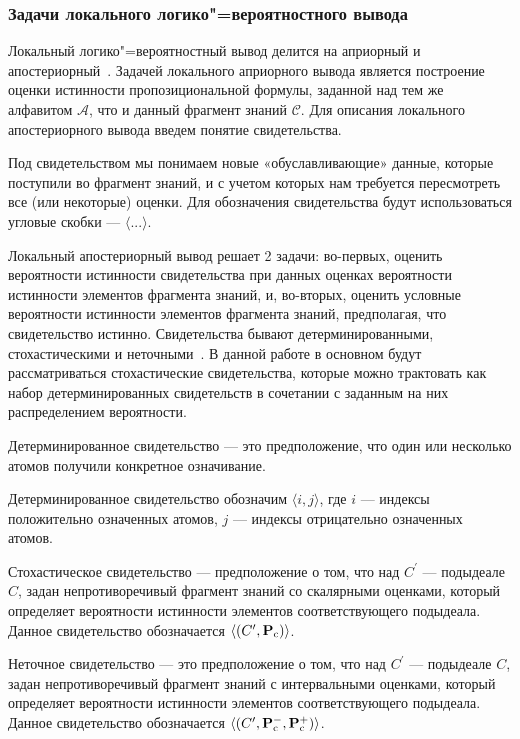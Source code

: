 \subsubsection{Задачи локального логико"=вероятностного вывода}
Локальный логико"=вероятностный вывод делится на априорный и апостериорный~\cite{ 184, 121, 109}. Задачей локального априорного вывода является построение оценки истинности пропозициональной формулы, заданной над тем же алфавитом $\mathcal{A}$, что и данный фрагмент знаний $\mathscr{C}$. 
Для описания локального апостериорного вывода введем понятие свидетельства.
\begin{definition}[\cite{184}]
Под свидетельством мы понимаем новые «обуславливающие» данные, которые поступили во фрагмент знаний, и с учетом которых нам требуется пересмотреть все (или некоторые) оценки.  Для обозначения свидетельства будут использоваться угловые скобки --- $\langle ...\rangle$.
\end{definition}

Локальный апостериорный вывод решает 2 задачи: во-первых, оценить вероятности истинности свидетельства при данных оценках вероятности истинности элементов фрагмента знаний, и, во-вторых, оценить условные вероятности истинности элементов фрагмента знаний, предполагая, что свидетельство истинно.
Свидетельства бывают детерминированными, стохастическими и неточными~\cite{184, 109}. В данной работе в основном будут рассматриваться стохастические свидетельства, которые можно трактовать как набор детерминированных свидетельств в сочетании с заданным на них распределением вероятности.
\begin{definition}[\cite{184}]
	Детерминированное свидетельство --- это предположение, что один или несколько атомов получили конкретное означивание. 
\end{definition}

Детерминированное свидетельство обозначим $\langle i,j\rangle$, где $i$ --- индексы положительно означенных атомов, $j$ --- индексы отрицательно означенных атомов.	
\begin{definition}[\cite{184}]
Стохастическое свидетельство --- предположение о том, что над $C^\prime$ --- подыдеале $C$, задан непротиворечивый фрагмент знаний со скалярными оценками,  который определяет вероятности истинности элементов соответствующего подыдеала. Данное свидетельство обозначается $\langle (C^\prime, \mathbf{P}_\mathrm{c}) \rangle$.
\end{definition}
\begin{definition}[\cite{184}]
	Неточное свидетельство --- это предположение о том, что над $C^\prime$ --- подыдеале $C$,  задан непротиворечивый фрагмент знаний с интервальными оценками, который определяет вероятности истинности элементов соответствующего подыдеала. Данное свидетельство обозначается $\langle (C^\prime, \mathbf{P}_\mathrm{c}^-, \mathbf{P}_\mathrm{c}^+) \rangle$.
\end{definition}

